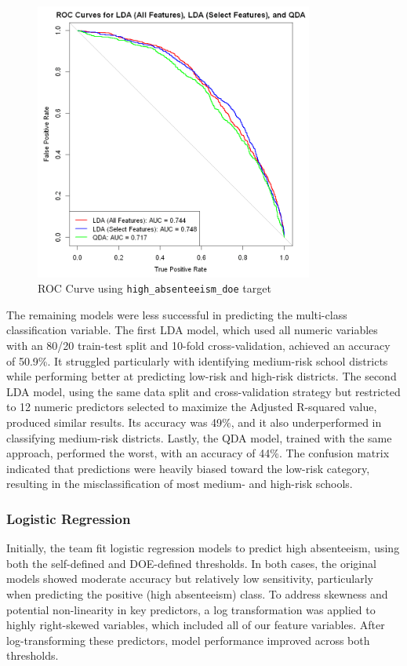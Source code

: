 \documentclass[
  11pt,
]{article}
\begin{document}
\begin{figure}[H]

{\centering \includegraphics[width=3.6in,height=\textheight]{../images/lda-qda-roc-doe.png}

}

\caption{ROC Curve using \texttt{high\_absenteeism\_doe} target}

\end{figure}%

The remaining models were less successful in predicting the multi-class
classification variable. The first LDA model, which used all numeric
variables with an 80/20 train-test split and 10-fold cross-validation,
achieved an accuracy of 50.9\%. It struggled particularly with
identifying medium-risk school districts while performing better at
predicting low-risk and high-risk districts. The second LDA model, using
the same data split and cross-validation strategy but restricted to 12
numeric predictors selected to maximize the Adjusted R-squared value,
produced similar results. Its accuracy was 49\%, and it also
underperformed in classifying medium-risk districts. Lastly, the QDA
model, trained with the same approach, performed the worst, with an
accuracy of 44\%. The confusion matrix indicated that predictions were
heavily biased toward the low-risk category, resulting in the
misclassification of most medium- and high-risk schools.

\subsubsection{Logistic Regression}\label{logistic-regression-1}

Initially, the team fit logistic regression models to predict high
absenteeism, using both the self-defined and DOE-defined thresholds. In
both cases, the original models showed moderate accuracy but relatively
low sensitivity, particularly when predicting the positive (high
absenteeism) class. To address skewness and potential non-linearity in
key predictors, a log transformation was applied to highly right-skewed
variables, which included all of our feature variables. After
log-transforming these predictors, model performance improved across
both thresholds.
\end{document}
